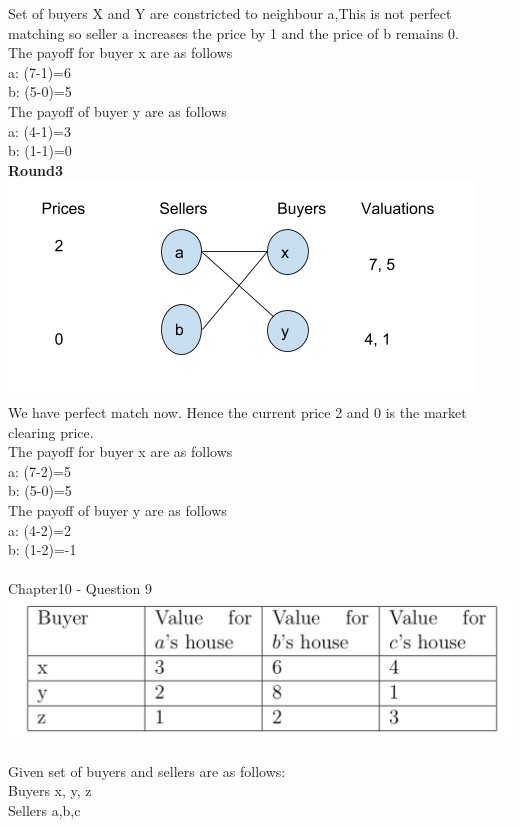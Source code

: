 \documentclass[]{article}
\begin{document}
Set of buyers X and Y are constricted to neighbour a,This is not perfect matching so seller a increases the price by 1 and the price of b remains 0.\\
The payoff for buyer x are as follows \\
a: (7-1)=6\\
b: (5-0)=5\\
The payoff of buyer y are as follows\\
a: (4-1)=3\\
b: (1-1)=0\\
\textbf{Round3} \\
\includegraphics[scale=.5]{8r3.png}\\
We have perfect match now. Hence the current price 2 and 0 is the market clearing price.\\
The payoff for buyer x are as follows \\
a: (7-2)=5\\
b: (5-0)=5\\
The payoff of buyer y are as follows\\
a: (4-2)=2\\
b: (1-2)=-1\\
\\
\newpage
Chapter10 - Question 9
\newline
\includegraphics[scale=.5]{9q.png}\\\\
Given set of buyers and sellers are as follows:\\
Buyers {x, y, z}\\
Sellers {a,b,c}\\
\end{document}
